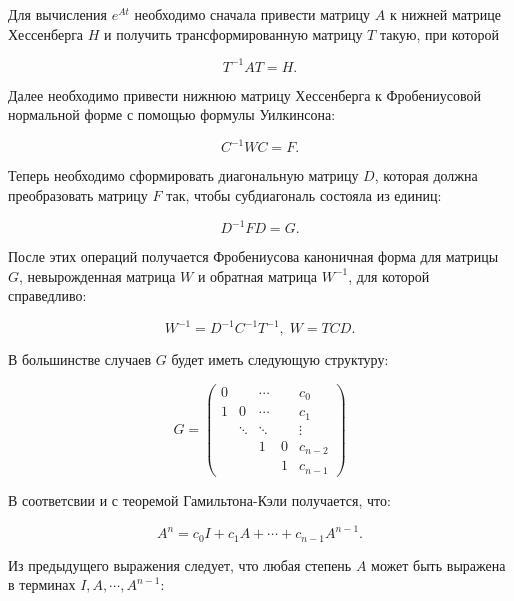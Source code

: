 \documentclass[master, och, times, pract]{sty/SCWorks}
\theoremstyle{plain}
\theoremstyle{definition}
\numberwithin{equation}{section}
\begin{document}
Для вычисления $e^{At}$ необходимо сначала привести матрицу $A$ к нижней матрице Хессенберга $H$ и получить трансформированную матрицу $T$ такую, при которой

\begin{equation}
T^{-1}AT=H.
\end{equation}

\noindent Далее необходимо привести нижнюю матрицу Хессенберга к Фробениусовой нормальной форме с помощью формулы Уилкинсона:

\begin{equation}
C^{-1}WC=F.
\end{equation}

\noindent Теперь необходимо сформировать диагональную матрицу $D$, которая должна преобразовать матрицу $F$ так, чтобы субдиагональ состояла из единиц:

\begin{equation}
D^{-1}FD=G.
\end{equation}

\noindent После этих операций получается Фробениусова каноничная форма \cite{bib:algebra:1} для матрицы $G$, невырожденная матрица $W$ и обратная матрица $W^{-1}$, для которой справедливо:

\begin{equation}
W^{-1}=D^{-1}C^{-1}T^{-1}, \; W=TCD.
\end{equation}

\noindent В большинстве случаев $G$ будет иметь следующую структуру:

\begin{equation}G=
\begin{pmatrix}
0 & & \cdots & & c_0\\
1 & 0 & \cdots & & c_1\\
& \ddots & \ddots & & \vdots \\
& & 1 & 0 & c_{n-2} \\
& & & 1 & c_{n-1}
\end{pmatrix}
\end{equation}

\noindent В соответсвии и с теоремой Гамильтона-Кэли \cite{bib:algebra:roitenberg} получается, что:

\begin{equation}
A^n=c_0I+c_1A+\cdots+c_{n-1}A^{n-1}.
\end{equation}

Из предыдущего выражения следует, что любая степень $A$ может быть выражена в терминах $I, A, \cdots, A^{n-1}$:
\end{document}
